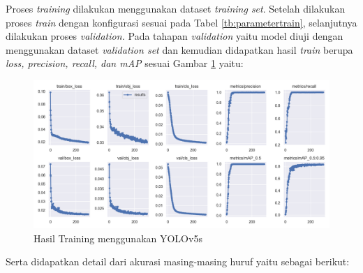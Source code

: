 Proses \textit{training} dilakukan menggunakan dataset \textit{training set}. Setelah dilakukan proses \textit{train} dengan konfigurasi sesuai pada Tabel \ref*{tb:parametertrain}, selanjutnya dilakukan proses \textit{validation.} Pada tahapan \textit{validation} yaitu model diuji dengan menggunakan dataset \textit{validation set} dan kemudian didapatkan hasil \textit{train} berupa \textit{loss, precision, recall, \textnormal{dan} mAP} sesuai Gambar \ref*{fig:trainresult} yaitu: \par

\begin{figure}[H]
  \centering
  \includegraphics[scale=0.5]{gambar/train_results.png}
  \caption{Hasil Training menggunakan YOLOv5s}
  \label{fig:trainresult}
\end{figure}

Serta didapatkan detail dari akurasi masing-masing huruf yaitu sebagai berikut: \par

